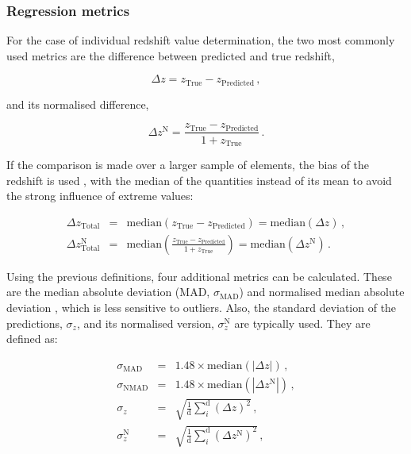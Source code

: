 \documentclass{aa}
\begin{document}
\subsubsection{Regression metrics}\label{sec:metrics_regression}

For the case of individual redshift value determination, the two most commonly used metrics are the difference between predicted and true redshift,

\begin{equation}
\Delta z = z_{\mathrm{True}} - z_{\mathrm{Predicted}}\,,
\end{equation}

\noindent and its normalised difference,

\begin{equation}\label{eq:delta_z_N}
\Delta z^{\mathrm{N}} = \frac{z_{\mathrm{True}} - z_{\mathrm{Predicted}}}{1 + z_{\mathrm{True}}}\,.
\end{equation}

If the comparison is made over a larger sample of elements, the bias of the redshift is used \citep{2013ApJ...775...93D}, with the median of the quantities instead of its mean to avoid the strong influence of extreme values:

\begin{eqnarray}
\Delta z_{\mathrm{Total}} &=& \mathrm{median}\left(z_{\mathrm{True}} - z_{\mathrm{Predicted}}\right) = \mathrm{median}(\Delta z)\,,\\
\Delta z_{\mathrm{Total}}^{\mathrm{N}} &=& \mathrm{median}\left(\frac{z_{\mathrm{True}} - z_{\mathrm{Predicted}}}{1 + z_{\mathrm{True}}}\right) = \mathrm{median}(\Delta z^{\mathrm{N}})\,.
\end{eqnarray}

Using the previous definitions, four additional metrics can be calculated. These are the median absolute deviation (MAD, $\sigma_{\mathrm{MAD}}$) and normalised median absolute deviation \citep[NMAD, $\sigma_{\mathrm{NMAD}}$;][]{hoaglin1983understanding, 2009ApJ...690.1236I}, which is less sensitive to outliers. Also, the standard deviation of the predictions, $\sigma_{z}$, and its normalised version, $\sigma_{z}^{\mathrm{N}}$ are typically used. They are defined as:

\begin{eqnarray}
\sigma_{\mathrm{MAD}} &=& 1.48 \times \mathrm{median}\left(|\Delta z|\right)\,,\\
\sigma_{\mathrm{NMAD}} &=& 1.48 \times \mathrm{median}\left(\left|\Delta z^{\mathrm{N}}\right|\right)\,,\\
\sigma_{z} &=& \sqrt{\frac{1}{\mathrm{d}} \sum_{i}^{\mathrm{d}} \left(\Delta z\right)^{2}}\,,\\
\sigma_{z}^{\mathrm{N}} &=& \sqrt{\frac{1}{\mathrm{d}} \sum_{i}^{\mathrm{d}} \left(\Delta z^{\mathrm{N}}\right)^{2}}\,,
\end{eqnarray}
\end{document}
